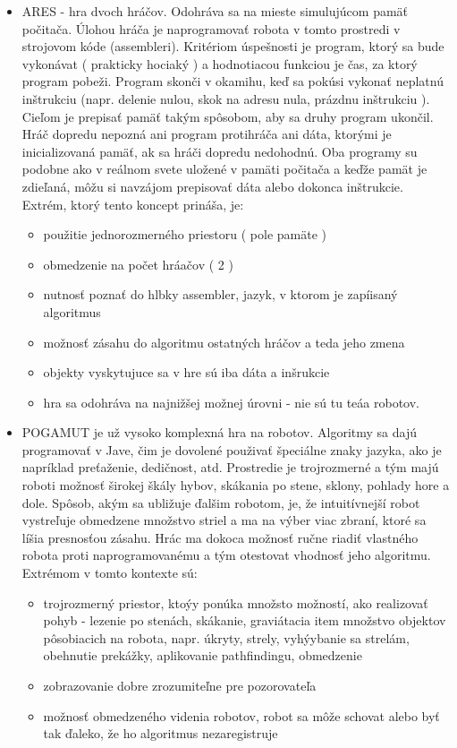 \begin{itemize}
\item ARES  - hra dvoch hráčov. Odohráva sa na mieste simulujúcom pamäť počitača. Úlohou hráča  je naprogramovať robota v tomto prostredi v strojovom kóde (assembleri). Kritériom úspešnosti je program, ktorý sa bude vykonávat ( prakticky hociaký ) a hodnotiacou funkciou je čas, za ktorý program pobeži. Program skonči v okamihu, keď sa pokúsi vykonať neplatnú inštrukciu (napr. delenie nulou, skok na adresu nula, prázdnu inštrukciu ).  Cieľom je  prepisať pamäť takým spôsobom, aby sa druhy program ukončil. Hráč dopredu nepozná ani program protihráča ani dáta, ktorými je inicializovaná pamäť, ak sa hráči dopredu nedohodnú. Oba programy su podobne ako v reálnom svete uložené v pamäti počitača a keďže pamät je zdieľaná, môžu si navzájom prepisovať dáta alebo dokonca inštrukcie. Extrém, ktorý tento koncept prináša, je: %
\begin{itemize}
\item použitie jednorozmerného priestoru ( pole pamäte ) 
\item obmedzenie na počet hráačov ( 2 )
\item nutnosť poznať do hlbky assembler, jazyk, v ktorom je zapíisaný algoritmus
\item možnosť zásahu do algoritmu ostatných hráčov a teda jeho zmena
\item objekty vyskytujuce sa v hre sú iba dáta a inšrukcie
\item hra sa odohráva na najnižšej možnej úrovni -  nie sú tu teáa robotov.
\end{itemize}
\item POGAMUT je už vysoko komplexná hra na robotov. Algoritmy sa dajú programovať v Jave, čim je dovolené použivať špeciálne znaky jazyka, ako je napríklad preťaženie, dedičnost, atd. Prostredie je trojrozmerné a tým majú roboti možnosť širokej škály hybov, skákania po stene, sklony, pohlady hore a dole. Spôsob, akým sa ubližuje ďalšim robotom, je, že intuitívnejší robot vystreľuje obmedzene množstvo striel a ma na výber viac zbraní, ktoré sa líšia presnosťou zásahu. Hrác ma dokoca možnosť ručne riadiť vlastného robota proti naprogramovanému a tým otestovat vhodnosť jeho algoritmu. \\
Extrémom v tomto kontexte sú:
\begin{itemize}
\item trojrozmerný priestor, ktoýy ponúka množsto možností, ako realizovať pohyb - lezenie po stenách, skákanie, graviátacia
item množstvo objektov pôsobiacich na robota, napr. úkryty, strely, vyhýybanie sa strelám, obehnutie prekážky, aplikovanie pathfindingu, obmedzenie
\item zobrazovanie dobre zrozumiteľne pre pozorovateľa
\item možnosť obmedzeného videnia robotov, robot sa môže schovat alebo byť tak ďaleko,  že ho algoritmus nezaregistruje
\end{itemize}
\end{itemize}
